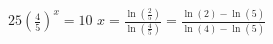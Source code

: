 {$25\left(\frac{4}{5}\right)^{x} = 10$  }
{$x = \frac{\ln\left(\frac{2}{5}\right)}{\ln\left(\frac{4}{5}\right)} = \frac{\ln(2)-\ln(5)}{\ln(4) - \ln(5)}$}

